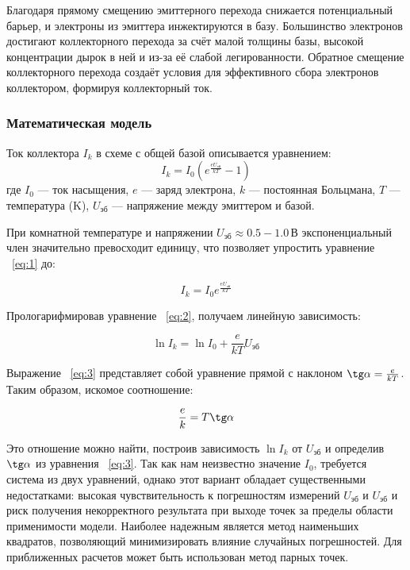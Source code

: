 Благодаря прямому смещению эмиттерного перехода снижается потенциальный барьер, и электроны из эмиттера инжектируются в базу. Большинство электронов достигают коллекторного перехода за счёт малой толщины базы, высокой концентрации дырок в ней и из-за её слабой легированности. Обратное смещение коллекторного перехода создаёт условия для эффективного сбора электронов коллектором, формируя коллекторный ток.

\subsubsection{Математическая модель}

Ток коллектора $I_k$ в схеме с общей базой описывается уравнением:
\begin{equation}
\label{eq:1}
   I_k = I_0 \left( e^{\frac{eU_{\text{эб}}}{kT}} - 1 \right)
\end{equation}
где $I_0$ — ток насыщения, $e$ — заряд электрона, $k$ — постоянная Больцмана, $T$ — температура (K), $U_{\text{эб}}$ — напряжение между эмиттером и базой.

При комнатной температуре и напряжении $U_{\text{эб}} \approx 0.5{-}1.0\,\text{В}$ экспоненциальный член значительно превосходит единицу, что позволяет упростить уравнение ~\ref{eq:1} до:

\begin{equation}
\label{eq:2}
   I_k = I_0e^{\frac{eU_{\text{эб}}}{kT}}
\end{equation}

Прологарифмировав уравнение ~\ref{eq:2}, получаем линейную зависимость:

\begin{equation}
\label{eq:3}
   \ln I_k = \ln I_0 + \frac{e}{kT}U_{\text{эб}}
\end{equation}

Выражение ~\ref{eq:3} представляет собой уравнение прямой с наклоном $ \tg \alpha = \frac{e}{kT}$. Таким образом, искомое соотношение:

\begin{equation}
\label{eq:4}
   \frac{e}{k} = T \tg \alpha
\end{equation}

Это отношение можно найти, построив зависимость $\ln I_k$ от $U_{\text{эб}}$ и определив $\tg \alpha$ из уравнения ~\ref{eq:3}. Так как нам неизвестно значение $I_0$, требуется система из двух уравнений, однако этот вариант обладает существенными недостатками: высокая чувствительность к погрешностям измерений $U_{\text{эб}}$ и $U_{\text{эб}}$ и риск получения некорректного результата при выходе точек за пределы области применимости модели. Наиболее надежным является метод наименьших квадратов, позволяющий минимизировать влияние случайных погрешностей. Для приближенных расчетов может быть использован метод парных точек.

